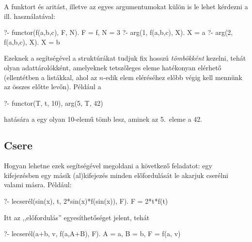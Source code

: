 A funktort és aritást, illetve az egyes
argumentumokat külön is le lehet kérdezni a
 ill.  használatával:
\begin{query}
?- functor(f(a,b,c), F, N).
F = f,
N = 3
?- arg(1, f(a,b,c), X).
X = a
?- arg(2, f(a,b,c), X).
X = b
\end{query}
Ezeknek a segítségével a struktúrákat tudjuk fix
hosszú \emph{tömbökként} kezelni, tehát olyan
adattárolókként, amelyeknek tetszőleges eleme
hatékonyan elérhető (ellentétben a listákkal, ahol
az $n$-edik elem eléréséhez előbb végig kell mennünk
az összes előtte levőn).
Például a
\begin{query}
?- functor(T, t, 10), arg(5, T, 42)
\end{query}
hatására a  egy olyan 10-elemű tömb lesz,
aminek az 5.~eleme a 42.

\subsection*{Csere}
Hogyan lehetne ezek segítségével megoldani a
következő feladatot: egy kifejezésben egy másik
(al)kifejezés minden előfordulását le akarjuk
cserélni valami másra. Például:
\begin{query}
?- lecserél(sin(x), t, 2*sin(x)*f(sin(x)), F).
F = 2*t*f(t)
\end{query}
Itt az ,,előfordulás'' egyesíthetőséget jelent,
tehát
\begin{query}
?- lecserél(a+b, v, f(a,A+B), F).
A = a,
B = b,
F = f(a, v)
\end{query}

